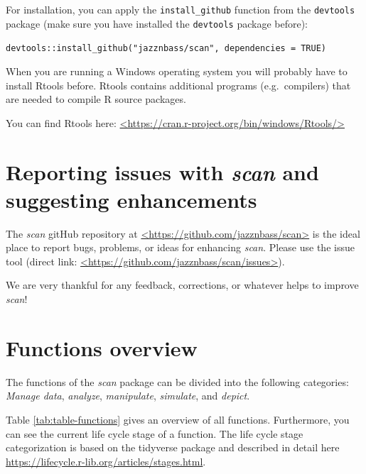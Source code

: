 \documentclass[
]{book}
\begin{document}
For installation, you can apply the \texttt{install\_github} function from the \texttt{devtools} package (make sure you have installed the \texttt{devtools} package before):

\texttt{devtools::install\_github("jazznbass/scan",\ dependencies\ =\ TRUE)}

When you are running a Windows operating system you will probably have to install Rtools before. Rtools contains additional programs (e.g.~compilers) that are needed to compile R source packages.

You can find Rtools here: \href{https://cran.r-project.org/bin/windows/Rtools/}{\textless https://cran.r-project.org/bin/windows/Rtools/\textgreater{}}

\hypertarget{reporting-issues-with-scan-and-suggesting-enhancements}{%
\section{\texorpdfstring{Reporting issues with \emph{scan} and suggesting enhancements}{Reporting issues with scan and suggesting enhancements}}\label{reporting-issues-with-scan-and-suggesting-enhancements}}

The \emph{scan} gitHub repository at \href{https://github.com/jazznbass/scan}{\textless https://github.com/jazznbass/scan\textgreater{}} is the ideal place to report bugs, problems, or ideas for enhancing \emph{scan}. Please use the issue tool (direct link: \href{https://github.com/jazznbass/scan/issues}{\textless https://github.com/jazznbass/scan/issues\textgreater{}}).

We are very thankful for any feedback, corrections, or whatever helps to improve \emph{scan}!

\hypertarget{functions-overview}{%
\section{Functions overview}\label{functions-overview}}

The functions of the \emph{scan} package can be divided into the following categories:\\
\emph{Manage data}, \emph{analyze}, \emph{manipulate}, \emph{simulate}, and \emph{depict}.

Table \ref{tab:table-functions} gives an overview of all functions. Furthermore, you can see the current life cycle stage of a function. The life cycle stage categorization is based on the tidyverse package and described in detail here \url{https://lifecycle.r-lib.org/articles/stages.html}.
\end{document}
